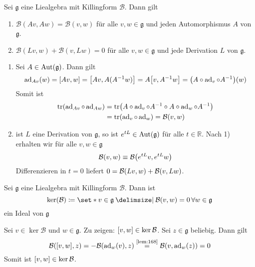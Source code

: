\begin{lemma}[label=lem:168]
	Sei $\mathfrak{g}$ eine Liealgebra mit Killingform $\mathcal{B}$.
	Dann gilt
	\begin{enumerate}[1)]
		\item $\mathcal{B}(Av,Aw) = \mathcal{B}(v,w)$ für alle $v,w \in \mathfrak{g}$ und jeden Automorphismus $A$ von $\mathfrak{g}$.
		\item $\mathcal{B}(Lv,w) + \mathcal{B}(v,Lw) =0$ für alle $v,w \in \mathfrak{g}$ und jede Derivation $L$ von $\mathfrak{g}$.
	\end{enumerate}
\end{lemma}
\begin{beweis}
	\begin{enumerate}[1)]
		\item Sei $A \in \Aut(\mathfrak{g})$.
		Dann gilt 
		\[
			\ad_{Av}(w) = \benbrace*{Av,w} = \benbrace*{Av,A (A^{-1}w)} = A \benbrace*{v,A^{-1} w} = \enbrace*{A \circ \ad_v \circ A^{-1}}(w)
		\]
		Somit ist
		\begin{align}
			\tr \enbrace*{\ad_{Av} \circ \ad_{Aw}} &= \tr \enbrace*{A \circ \ad_v \circ A^{-1} \circ A \circ \ad_w \circ A^{-1}} \\
			&= \tr \enbrace*{\ad_v \circ \ad_w} = \mathcal{B}(v,w)
		\end{align}
		\item ist $L$ eine Derivation von $\mathfrak{g}$, so ist $e^{tL} \in \Aut(\mathfrak{g})$ für alle $t \in \mathbb{R}$.
		Nach 1) erhalten wir für alle $v,w \in \mathfrak{g}$
		\[
			\mathcal{B}(v,w) \equiv \mathcal{B}\enbrace*{e^{tL}v, e^{tL}w} 
		\]
		Differenzieren in $t=0$ liefert $0= \mathcal{B} \enbrace*{Lv,w} + \mathcal{B}(v,Lw)$.\qedhere
	\end{enumerate}
\end{beweis}

\begin{lemma}[label=lem:169]
	Sei $\mathfrak{g}$ eine Liealgebra mit Killingform $\mathcal{B}$.
	Dann ist 
	\[
		\ker(\mathcal{B}) \coloneqq \set*{v \in \mathfrak{g} \given \mathcal{B}(v,w)=0 \,\forall w \in \mathfrak{g}}
	\]
	ein Ideal von $\mathfrak{g}$
\end{lemma}
\begin{beweis}
	Sei $v \in \ker \mathcal{B}$ und $w \in \mathfrak{g}$.
	Zu zeigen: $\benbrace*{v,w} \in \ker \mathcal{B}$.
	Sei $z \in \mathfrak{g}$ beliebig.
	Dann gilt 
	\[
		\mathcal{B} \enbrace*{\benbrace*{v,w},z} = - \mathcal{B} \enbrace*{\ad_w(v),z} \StackText{\ref{lem:168}}{=} \mathcal{B} \enbrace*{v, \ad_w(z)} =0 
	\]
	Somit ist $\benbrace*{v,w} \in \ker \mathcal{B}$.
\end{beweis}

